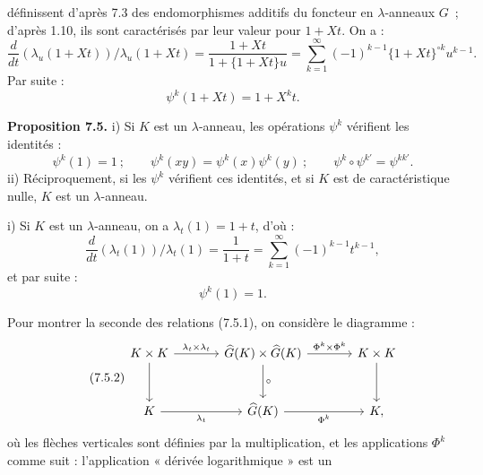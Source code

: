 définissent d'après 7.3 des endomorphismes additifs du foncteur en \(\lambda\)-anneaux \(G\)~; d'après 1.10, ils sont caractérisés par leur valeur pour \(1+Xt\). On a :
\[
  \frac{d}{dt}(\lambda_u(1+Xt))/\lambda_u(1+Xt)
  =
  \frac{1+Xt}{1+\{1+Xt\}u}
  =
  \sum_{k=1}^{\infty}(-1)^{k-1}\{1+Xt\}^{\circ k}u^{k-1}.
\]
Par suite :
\begin{equation}\tag{7.4.1}
  \psi^k(1+Xt)=1+X^k t.
\end{equation}

\textbf{Proposition 7.5.} i) Si \(K\) est un \(\lambda\)-anneau, les opérations \(\psi^k\) vérifient les identités :
\begin{equation}\tag{7.5.1}
  \psi^k(1)=1~;\qquad
  \psi^k(xy)=\psi^k(x)\psi^k(y)~;\qquad
  \psi^k\circ\psi^{k'}=\psi^{kk'}.
\end{equation}
ii) Réciproquement, si les \(\psi^k\) vérifient ces identités, et si \(K\) est de caractéristique nulle, \(K\) est un \(\lambda\)-anneau.

i) Si \(K\) est un \(\lambda\)-anneau, on a \(\lambda_t(1)=1+t\), d'où :
\[
  \frac{d}{dt}(\lambda_t(1))/\lambda_t(1)
  =
  \frac1{1+t}
  =
  \sum_{k=1}^{\infty}(-1)^{k-1}t^{k-1},
\]
et par suite :
\[
  \psi^k(1)=1.
\]

Pour montrer la seconde des relations (7.5.1), on considère le diagramme :
\begin{equation}\tag{7.5.2}
\begin{tikzcd}[column sep=large,row sep=large]
K\times K \arrow[r,"\lambda_t\times\lambda_t"] \arrow[d] &
\widehat G(K)\times\widehat G(K) \arrow[r,"\Phi^k\times\Phi^k"] \arrow[d,"\circ"] &
K\times K \arrow[d]\\
K \arrow[r,"\lambda_t"'] &
\widehat G(K) \arrow[r,"\Phi^k"'] &
K ,
\end{tikzcd}
\end{equation}
où les flèches verticales sont définies par la multiplication, et les applications \(\Phi^k\) comme suit : l'application « dérivée logarithmique » est un
